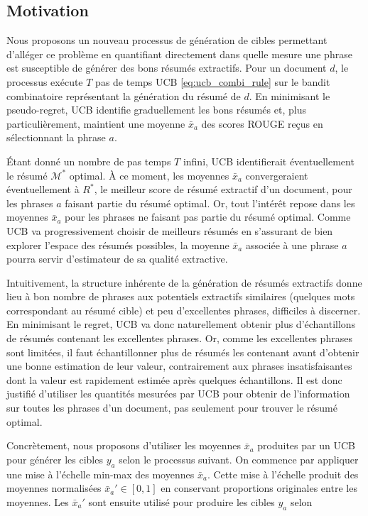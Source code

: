 \subsection{Motivation}

Nous proposons un nouveau processus de génération de cibles 
permettant d'alléger ce problème en quantifiant 
directement dans quelle mesure une phrase est susceptible de générer 
des bons résumés extractifs.
Pour un document $d$, le processus exécute $T$ pas de temps UCB \eqref{eq:ucb_combi_rule}
sur le bandit combinatoire représentant la génération du résumé de $d$.
En minimisant le pseudo-regret, UCB identifie graduellement les 
bons résumés et, plus particulièrement, maintient une 
moyenne $\bar{x}_a$ des scores ROUGE reçus en sélectionnant la phrase $a$.

Étant donné un nombre de pas temps $T$ infini, UCB 
identifierait éventuellement le résumé $\mathcal{M}^*$ optimal.
À ce moment, les moyennes $\bar{x}_a$ convergeraient éventuellement à $R^*$, 
le meilleur score de résumé extractif d'un document, pour les phrases $a$ faisant
partie du résumé optimal.
Or, tout l'intérêt repose dans les moyennes $\bar{x}_a$ pour les 
phrases ne faisant pas partie du résumé optimal.
Comme UCB va progressivement choisir de meilleurs résumés en s'assurant 
de bien explorer l'espace des résumés possibles, la moyenne $\bar{x}_a$ associée 
à une phrase $a$ pourra servir d'estimateur de sa qualité extractive.

Intuitivement, la structure inhérente de la génération 
de résumés extractifs donne lieu à bon nombre de phrases aux 
potentiels extractifs similaires (quelques mots correspondant au résumé cible) 
et peu d'excellentes phrases, difficiles à discerner.
En minimisant le regret, UCB va donc naturellement obtenir plus d'échantillons de résumés contenant 
les excellentes phrases.
Or, comme les excellentes phrases sont limitées, il faut échantillonner plus de résumés les contenant
avant d'obtenir une bonne estimation de leur valeur, contrairement aux phrases insatisfaisantes 
dont la valeur est rapidement estimée après quelques échantillons.
Il est donc justifié d'utiliser les quantités mesurées par UCB pour obtenir de l'information 
sur toutes les phrases d'un document, pas seulement pour trouver le résumé optimal.

Concrètement, nous proposons d'utiliser les moyennes $\bar{x}_a$ produites 
par un UCB pour générer les cibles $y_a$ selon le processus suivant.
On commence par appliquer une mise à l'échelle min-max des moyennes $\bar{x}_a$.
Cette mise à l'échelle produit des moyennes normalisées $\bar{x}_a' \in [0, 1]$
en conservant proportions originales entre les moyennes.
Les $\bar{x}_a'$ sont ensuite utilisé pour produire les cibles $y_a$ selon

